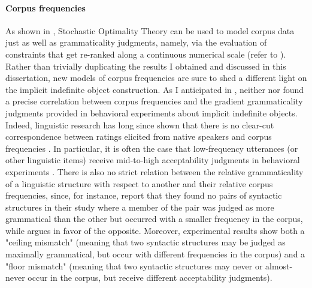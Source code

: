 
\paragraph{Corpus frequencies}

As shown in \textcite{Boersma2004, BoersmaHayes2001empirical}, Stochastic Optimality Theory can be used to model corpus data just as well as grammaticality judgments, namely, via the evaluation of constraints that get re-ranked along a continuous numerical scale (refer to ). Rather than trivially duplicating the results I obtained and discussed in this dissertation, new models of corpus frequencies are sure to shed a different light on the implicit indefinite object construction. As I anticipated in , neither \textcite{Resnik1993, Resnik1996} nor \textcite{Medina2007} found a precise correlation between corpus frequencies and the gradient grammaticality judgments provided in behavioral experiments about implicit indefinite objects.\\
Indeed, linguistic research has long since shown that there is no clear-cut correspondence between ratings elicited from native speakers and corpus frequencies \parencite{manning2003probabilistic}. In particular, it is often the case that low-frequency utterances (or other linguistic items) receive mid-to-high acceptability judgments in behavioral experiments \parencite{KempenHarbusch2005, BermelKnittl2012, BaderHaussler2010, Boersma2004, KellerAsudeh2002}. There is also no strict relation between the relative grammaticality of a linguistic structure with respect to another and their relative corpus frequencies, since, for instance, \textcite[315-316]{BaderHaussler2010} report that they found no pairs of syntactic structures in their study where a member of the pair was judged as more grammatical than the other but occurred with a smaller frequency in the corpus, while \textcite{Boersma2004} argues in favor of the opposite. Moreover, \textcite{BaderHaussler2010} experimental results show both a "ceiling mismatch" (meaning that two syntactic structures may be judged as maximally grammatical, but occur with different frequencies in the corpus) and a "floor mismatch" (meaning that two syntactic structures may never or almost-never occur in the corpus, but receive different acceptability judgments).\\
